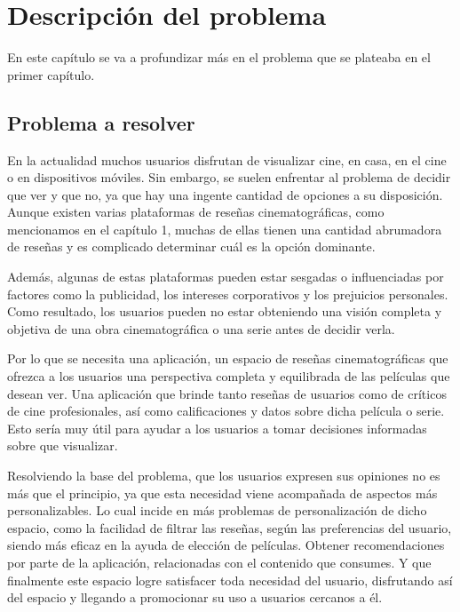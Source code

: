\chapter{Descripción del problema}

En este capítulo se va a profundizar más en el problema que se plateaba en el primer capítulo.

\section{Problema a resolver}

En la actualidad muchos usuarios disfrutan de visualizar cine, en casa, en el cine o en 
dispositivos móviles. Sin embargo, se suelen enfrentar al problema de decidir que ver y que no, ya que 
hay una ingente cantidad de opciones a su disposición. Aunque existen varias plataformas de reseñas 
cinematográficas, como mencionamos en el capítulo 1, muchas de ellas tienen una cantidad abrumadora de 
reseñas y es complicado determinar cuál es la opción dominante.

Además, algunas de estas plataformas pueden estar sesgadas o influenciadas por factores como la 
publicidad, los intereses corporativos y los prejuicios personales. Como resultado, los usuarios pueden 
no estar obteniendo una visión completa y objetiva de una obra cinematográfica o una serie antes de 
decidir verla.

Por lo que se necesita una aplicación, un espacio de reseñas cinematográficas que ofrezca a los 
usuarios una perspectiva completa y equilibrada de las películas que desean ver. Una 
aplicación que brinde tanto reseñas de usuarios como de críticos de cine profesionales, así como 
calificaciones y datos sobre dicha película o serie. Esto sería muy útil para ayudar a los usuarios a 
tomar decisiones informadas sobre que visualizar.

Resolviendo la base del problema, que los usuarios expresen sus opiniones no es más que el principio, 
ya que esta necesidad viene acompañada de aspectos más personalizables. Lo cual incide en más problemas 
de personalización de dicho espacio, como la facilidad de filtrar las reseñas, según las preferencias 
del usuario, siendo más eficaz en la ayuda de elección de películas. Obtener recomendaciones 
por parte de la aplicación, relacionadas con el contenido que consumes. Y que finalmente este espacio 
logre satisfacer toda necesidad del usuario, disfrutando así del espacio y llegando a promocionar su 
uso a usuarios cercanos a él.


